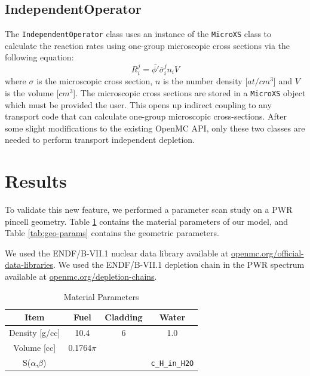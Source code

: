\documentclass[a4paper,fleqn]{cas-dc}
\begin{document}
            
    \subsection{IndependentOperator}
        The \verb.IndependentOperator. class uses an instance of the
        \verb.MicroXS. class to calculate the reaction rates using one-group
        microscopic cross sections via the following equation:
        \begin{equation}
            R^j_i = \bar{\phi'} \bar{\sigma}^j_i n_i V
        \end{equation}
        where $\sigma$ is the microscopic cross section, $n$ is the number
        density [$at/cm^3$] and $V$ is the volume [$cm^3$]. The microscopic
        cross sections are stored in a \verb.MicroXS. object which must be
        provided the user. This opens up indirect coupling to any transport code
        that can calculate one-group microscopic cross-sections. After some
        slight modifications to the existing OpenMC API, only these two classes
        are needed to perform transport independent depletion.

\section{Results}\label{sec:results}
    To validate this new feature, we performed a parameter scan study on a PWR
    pincell geometry.  Table \ref{tab:mat-params} contains the material
    parameters of our model, and Table \ref{tab:geo-params} contains the
    geometric parameters.

    We used the ENDF/B-VII.1 nuclear data library available at
    \url{openmc.org/official-data-libraries}. We used the ENDF/B-VII.1 depletion
    chain in the PWR spectrum available at \url{openmc.org/depletion-chains}.
    
    \begin{table}
        \caption{Material Parameters}\label{tab:mat-params}
        \begin{tabular*}{\tblwidth}{|c|c|c|c|}
            \hline
             Item & Fuel & Cladding & Water \\ %
            \hline
             Density [g/cc] & 10.4 & 6 & 1.0\\
             Volume [cc] & 0.1764$\pi$ & & \\
             S($\alpha$,$\beta$) &  & & \verb.c_H_in_H2O.\\
            \hline
        \end{tabular*}
    \end{table}
    
\end{document}
